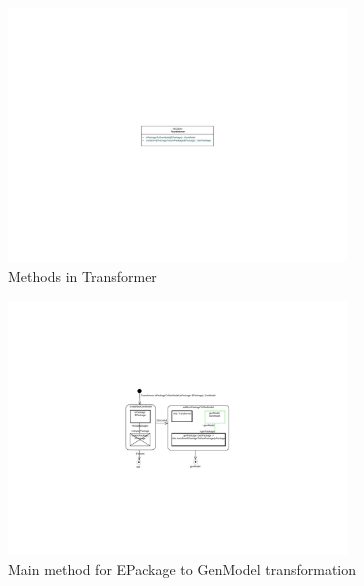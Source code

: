 \begin{figure}[htbp]
\begin{center}  
\includegraphics[width=0.8\textwidth]{pics/Ecore2GenModel/CDTransformer}
\caption{Methods in \textsf{Transformer}}  
\label{fig_e2gm}
\end{center}
\end{figure} 

\begin{figure}[htbp]
\begin{center}  \includegraphics[width=0.8\textwidth]{pics/Ecore2GenModel/SDMePackageToGenModel.pdf}
        \caption{Main method for \textsf{EPackage} to \textsf{GenModel} transformation}  
  \label{fig_pack2gm}
\end{center}
\end{figure} 

